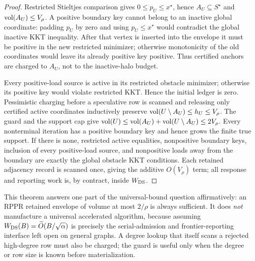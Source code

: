 \begin{proof}
Restricted Stieltjes comparison gives $0\leq p_U\leq x^\star$, hence
$A_U\subseteq S^\star$ and $\operatorname{vol}(A_U)\leq V_\rho$.  A positive boundary key
cannot belong to an inactive global coordinate: padding $p_U$ by zero and
using $p_U\leq x^\star$ would contradict the global inactive KKT inequality.
After that vertex is inserted into the envelope it must be positive in the
new restricted minimizer; otherwise monotonicity of the old coordinates
would leave its already positive key positive.  Thus certified anchors are
charged to $A_U$, not to the inactive-halo budget.

Every positive-load source is active in its restricted obstacle minimizer;
otherwise its positive key would violate restricted KKT.  Hence the initial
ledger is zero.  Pessimistic charging before a speculative row is scanned and
releasing only certified active coordinates inductively preserve
$\operatorname{vol}(U\setminus A_U)\leq h_U\leq V_\rho$.  The guard and the support cap give
$\operatorname{vol}(U)\leq\operatorname{vol}(A_U)+\operatorname{vol}(U\setminus A_U)\leq2V_\rho$.
Every nonterminal iteration has a positive boundary key and hence grows the
finite true support.  If there is none, restricted active equalities,
nonpositive boundary keys, inclusion of every positive-load source, and
nonpositive loads away from the boundary are exactly the global obstacle KKT
conditions.
Each retained adjacency record is scanned once, giving the additive
$O(V_\rho)$ term; all response and reporting work is, by contract, inside
$W_{\rm DS}$.
\end{proof}

This theorem answers one part of the universal-bound question affirmatively:
an RPPR retained envelope of volume at most $2/\rho$ is always sufficient.
It does
\emph{not} manufacture a universal accelerated algorithm, because assuming
$W_{\rm DS}(B)=\widetilde O(B/\sqrt\alpha)$ is precisely the
serial-admission and frontier-reporting interface left open on general
graphs.  A degree lookup that itself scans a rejected high-degree row must
also be charged; the guard is useful only when the degree or row size is
known before materialization.


